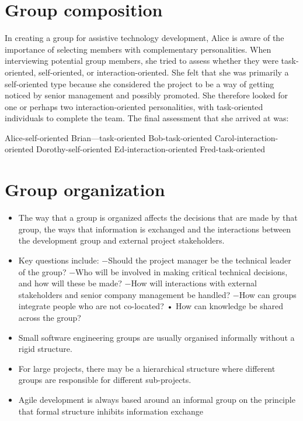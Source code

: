 \section{ Group composition}


In creating a group for assistive technology development, Alice is aware of the importance of selecting members with complementary personalities. When interviewing potential group members, she tried to assess whether they were task-oriented, self-oriented, or interaction-oriented. She felt that she was primarily a self-oriented type because she considered the project to be a way of getting noticed by senior management and possibly promoted. She therefore looked for one or perhaps two interaction-oriented personalities, with task-oriented individuals to complete the team. The final assessment that she arrived at was:


Alice-self-oriented Brian—task-oriented Bob-task-oriented Carol-interaction-oriented Dorothy-self-oriented Ed-interaction-oriented Fred-task-oriented

\section{Group organization}
\begin{itemize}

\item The way that a group is organized affects the decisions that are made by that group, the ways that information is exchanged and the interactions between the development group and external project stakeholders.

\item Key questions include:
\newline $-$Should the project manager be the technical leader of the group?
\newline $-$Who will be involved in making critical technical decisions, and how will these be made?
\newline $-$How will interactions with external stakeholders and senior company management be handled?
\newline $-$How can groups integrate people who are not co-located? • How can knowledge be shared across the group?

\item Small software engineering groups are usually organised informally without a rigid structure.

\item For large projects, there may be a hierarchical structure where different groups are responsible for different sub-projects.

\item Agile development is always based around an informal group on the principle that formal structure inhibits information exchange

\end{itemize}
